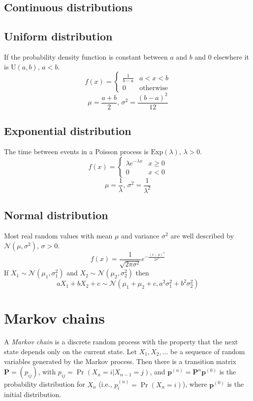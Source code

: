 \subsection{Continuous distributions}

\subsection{Uniform distribution}
If the probability density function is constant between $a$ and $b$ and 0 elsewhere it is $\textrm{U}(a,b),\,a<b$.
\[f(x) = \left\{
\begin{array}{cl}
\frac{1}{b-a} & a<x<b\\
0 & \textrm{otherwise}
\end{array}\right.\]
\[\mu=\frac{a+b}{2},\,\sigma^2=\frac{(b-a)^2}{12}\]

\subsection{Exponential distribution}
The time between events in a Poisson process is $\textrm{Exp}(\lambda),\,\lambda>0$.
\[f(x) = \left\{
\begin{array}{cl}
\lambda e^{-\lambda x} & x\geq0\\
0 & x<0
\end{array}\right.\]
\[\mu=\frac{1}{\lambda},\,\sigma^2=\frac{1}{\lambda^2}\]

\subsection{Normal distribution}
Most real random values with mean $\mu$ and variance $\sigma^2$ are well described by $\mathcal{N}(\mu,\sigma^2),\,\sigma>0$.
\[ f(x) = \frac{1}{\sqrt{2\pi\sigma^2}}e^{-\frac{(x-\mu)^2}{2\sigma^2}} \]
If $X_1 \sim \mathcal{N}(\mu_1,\sigma_1^2)$ and $X_2 \sim \mathcal{N}(\mu_2,\sigma_2^2)$ then
\[ aX_1 + bX_2 + c \sim \mathcal{N}(\mu_1+\mu_2+c,a^2\sigma_1^2+b^2\sigma_2^2) \]

\section{Markov chains}
A \emph{Markov chain} is a discrete random process with the property that the next state depends only on the current state.
Let $X_1,X_2,\ldots$ be a sequence of random variables generated by the Markov process.
Then there is a transition matrix $\mathbf{P} = (p_{ij})$, with $p_{ij} = \Pr(X_n = i | X_{n-1} = j)$,
and $\mathbf{p}^{(n)} = \mathbf P^n \mathbf p^{(0)}$ is the probability distribution for $X_n$ (i.e., $p^{(n)}_i = \Pr(X_n = i)$),
where $\mathbf{p}^{(0)}$ is the initial distribution.

